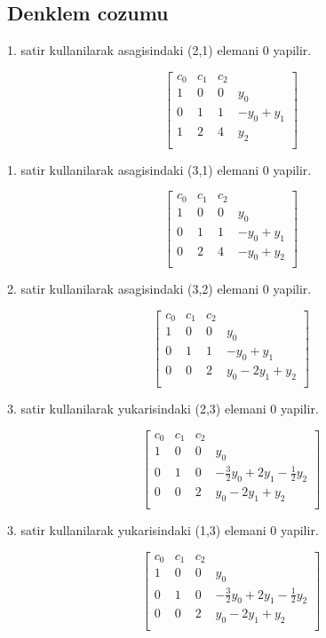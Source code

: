 \documentclass{article}
\begin{document}
\subsection{Denklem cozumu}
1. satir kullanilarak  asagisindaki (2,1) elemani 0 yapilir.\begin{center}
$$ \left[\begin{array}{rrr|r}
c_{0} & c_{1} & c_{2}\\
1 & 0 & 0 & y_{0}\\
0 & 1 & 1 & -y_{0}+y_{1}\\
1 & 2 & 4 & y_{2}\\
\end{array}\right] $$
\end{center}
1. satir kullanilarak  asagisindaki (3,1) elemani 0 yapilir.\begin{center}
$$ \left[\begin{array}{rrr|r}
c_{0} & c_{1} & c_{2}\\
1 & 0 & 0 & y_{0}\\
0 & 1 & 1 & -y_{0}+y_{1}\\
0 & 2 & 4 & -y_{0}+y_{2}\\
\end{array}\right] $$
\end{center}
2. satir kullanilarak  asagisindaki (3,2) elemani 0 yapilir.\begin{center}
$$ \left[\begin{array}{rrr|r}
c_{0} & c_{1} & c_{2}\\
1 & 0 & 0 & y_{0}\\
0 & 1 & 1 & -y_{0}+y_{1}\\
0 & 0 & 2 & y_{0}-2y_{1}+y_{2}\\
\end{array}\right] $$
\end{center}
3. satir kullanilarak  yukarisindaki (2,3) elemani 0 yapilir.\begin{center}
$$ \left[\begin{array}{rrr|r}
c_{0} & c_{1} & c_{2}\\
1 & 0 & 0 & y_{0}\\
0 & 1 & 0 & -\frac{3}{2}y_{0}+2y_{1}-\frac{1}{2}y_{2}\\
0 & 0 & 2 & y_{0}-2y_{1}+y_{2}\\
\end{array}\right] $$
\end{center}
3. satir kullanilarak  yukarisindaki (1,3) elemani 0 yapilir.\begin{center}
$$ \left[\begin{array}{rrr|r}
c_{0} & c_{1} & c_{2}\\
1 & 0 & 0 & y_{0}\\
0 & 1 & 0 & -\frac{3}{2}y_{0}+2y_{1}-\frac{1}{2}y_{2}\\
0 & 0 & 2 & y_{0}-2y_{1}+y_{2}\\
\end{array}\right] $$
\end{center}
\end{document}
